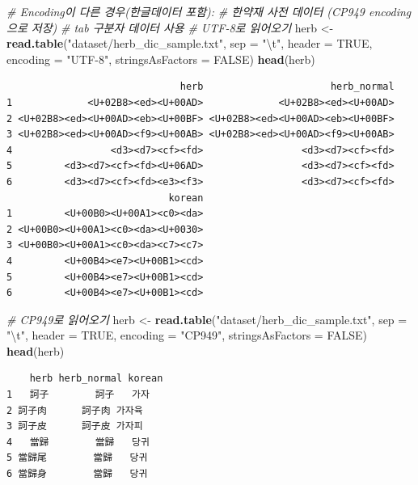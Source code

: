 \documentclass[
  11pt,
]{krantz}
\newenvironment{Shaded}{\begin{snugshade}}{\end{snugshade}}
\newcommand{\CharTok}[1]{\textcolor[rgb]{0.5,0.5,0.5}{#1}}
\newcommand{\CommentTok}[1]{\textcolor[rgb]{0.37,0.37,0.37}{\textit{#1}}}
\newcommand{\DataTypeTok}[1]{\textcolor[rgb]{0.27,0.27,0.27}{#1}}
\newcommand{\KeywordTok}[1]{\textcolor[rgb]{0.27,0.27,0.27}{\textbf{#1}}}
\newcommand{\NormalTok}[1]{#1}
\newcommand{\OtherTok}[1]{\textcolor[rgb]{0.37,0.37,0.37}{#1}}
\newcommand{\StringTok}[1]{\textcolor[rgb]{0.5,0.5,0.5}{#1}}
\begin{document}
\begin{Shaded}
\begin{Highlighting}[]
\CommentTok{# Encoding이 다른 경우(한글데이터 포함): }
\CommentTok{# 한약재 사전 데이터 (CP949 encoding으로 저장)}
\CommentTok{# tab 구분자 데이터 사용}
\CommentTok{# UTF-8로 읽어오기}
\NormalTok{herb <-}\StringTok{ }\KeywordTok{read.table}\NormalTok{(}\StringTok{"dataset/herb_dic_sample.txt"}\NormalTok{, }\DataTypeTok{sep =} \StringTok{"}\CharTok{\textbackslash{}t}\StringTok{"}\NormalTok{, }
                   \DataTypeTok{header =} \OtherTok{TRUE}\NormalTok{, }
                   \DataTypeTok{encoding =} \StringTok{"UTF-8"}\NormalTok{, }
                   \DataTypeTok{stringsAsFactors =} \OtherTok{FALSE}\NormalTok{)}
\KeywordTok{head}\NormalTok{(herb)}
\end{Highlighting}
\end{Shaded}

\begin{verbatim}
                              herb                      herb_normal
1             <U+02B8><ed><U+00AD>             <U+02B8><ed><U+00AD>
2 <U+02B8><ed><U+00AD><eb><U+00BF> <U+02B8><ed><U+00AD><eb><U+00BF>
3 <U+02B8><ed><U+00AD><f9><U+00AB> <U+02B8><ed><U+00AD><f9><U+00AB>
4                 <d3><d7><cf><fd>                 <d3><d7><cf><fd>
5         <d3><d7><cf><fd><U+06AD>                 <d3><d7><cf><fd>
6         <d3><d7><cf><fd><e3><f3>                 <d3><d7><cf><fd>
                            korean
1         <U+00B0><U+00A1><c0><da>
2 <U+00B0><U+00A1><c0><da><U+0030>
3 <U+00B0><U+00A1><c0><da><c7><c7>
4         <U+00B4><e7><U+00B1><cd>
5         <U+00B4><e7><U+00B1><cd>
6         <U+00B4><e7><U+00B1><cd>
\end{verbatim}

\begin{Shaded}
\begin{Highlighting}[]
\CommentTok{# CP949로 읽어오기}
\NormalTok{herb <-}\StringTok{ }\KeywordTok{read.table}\NormalTok{(}\StringTok{"dataset/herb_dic_sample.txt"}\NormalTok{, }\DataTypeTok{sep =} \StringTok{"}\CharTok{\textbackslash{}t}\StringTok{"}\NormalTok{, }
                   \DataTypeTok{header =} \OtherTok{TRUE}\NormalTok{, }
                   \DataTypeTok{encoding =} \StringTok{"CP949"}\NormalTok{, }
                   \DataTypeTok{stringsAsFactors =} \OtherTok{FALSE}\NormalTok{)}
\KeywordTok{head}\NormalTok{(herb)}
\end{Highlighting}
\end{Shaded}

\begin{verbatim}
    herb herb_normal korean
1   訶子        訶子   가자
2 訶子肉      訶子肉 가자육
3 訶子皮      訶子皮 가자피
4   當歸        當歸   당귀
5 當歸尾        當歸   당귀
6 當歸身        當歸   당귀
\end{verbatim}
\end{document}
